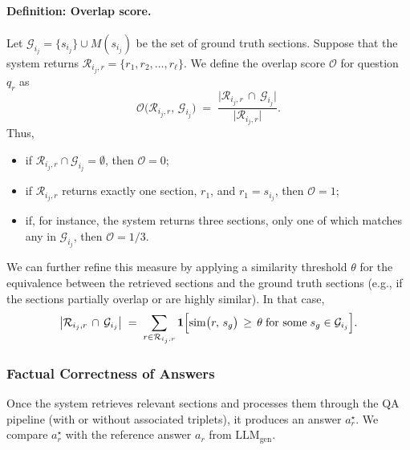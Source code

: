 \documentclass{article}
\begin{document}
\paragraph{Definition: Overlap score.}
Let \(\mathcal{G}_{i_j} = \{s_{i_j}\} \cup M(s_{i_j})\) be the set of ground truth sections. Suppose that the system returns \(\mathcal{R}_{i_j,r} = \{r_1, r_2, \dots, r_\ell\}\). We define the overlap score \(\mathcal{O}\) for question \(q_r\) as
\[
\mathcal{O}\bigl(\mathcal{R}_{i_j,r},\, \mathcal{G}_{i_j}\bigr)
\;=\;
\frac{\bigl|\mathcal{R}_{i_j,r} \,\cap\, \mathcal{G}_{i_j}\bigr|}
{\bigl|\mathcal{R}_{i_j,r}\bigr|}.
\]
Thus, 
\begin{itemize}
\item if \(\mathcal{R}_{i_j,r}\cap\mathcal{G}_{i_j} = \emptyset\), then \(\mathcal{O} = 0\);
\item if \(\mathcal{R}_{i_j,r}\) returns exactly one section, \(r_1\), and \(r_1 = s_{i_j}\), then \(\mathcal{O} = 1\);
\item if, for instance, the system returns three sections, only one of which matches any in \(\mathcal{G}_{i_j}\), then \(\mathcal{O} = 1/3\).
\end{itemize}

We can further refine this measure by applying a similarity threshold \(\theta\) for the equivalence between the retrieved sections and the ground truth sections (e.g., if the sections partially overlap or are highly similar). In that case,
\[
\bigl|\mathcal{R}_{i_j,r} \,\cap\, \mathcal{G}_{i_j}\bigr|
\;=\;
\sum_{r \in \mathcal{R}_{i_j,r}}
\mathbf{1}\Bigl[\mathrm{sim}\bigl(r,\, s_{g}\bigr) \,\ge\, \theta
\;\text{for some}\; s_g \in \mathcal{G}_{i_j}\Bigr].
\]

\subsubsection{Factual Correctness of Answers}

Once the system retrieves relevant sections and processes them through the QA pipeline (with or without associated triplets), it produces an answer \(a_r^\star\). We compare \(a_r^\star\) with the reference answer \(a_r\) from \(\mathrm{LLM}_{\text{gen}}\).
\end{document}
